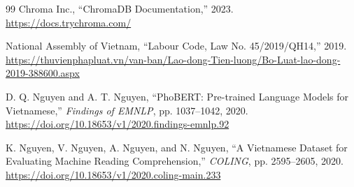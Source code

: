 \documentclass[12pt,a4paper,oneside]{report}
\begin{document}
\begin{thebibliography}{99}
Chroma Inc., ``ChromaDB Documentation,'' 2023.
\url{https://docs.trychroma.com/}

National Assembly of Vietnam, ``Labour Code, Law No. 45/2019/QH14,'' 2019.
\url{https://thuvienphapluat.vn/van-ban/Lao-dong-Tien-luong/Bo-Luat-lao-dong-2019-388600.aspx}

D. Q. Nguyen and A. T. Nguyen, ``PhoBERT: Pre-trained Language Models for
Vietnamese,'' \textit{Findings of EMNLP}, pp. 1037--1042, 2020.
\url{https://doi.org/10.18653/v1/2020.findings-emnlp.92}

K. Nguyen, V. Nguyen, A. Nguyen, and N. Nguyen, ``A Vietnamese Dataset for
Evaluating Machine Reading Comprehension,'' \textit{COLING}, pp. 2595--2605,
2020. \url{https://doi.org/10.18653/v1/2020.coling-main.233}

\end{thebibliography}
\end{document}
